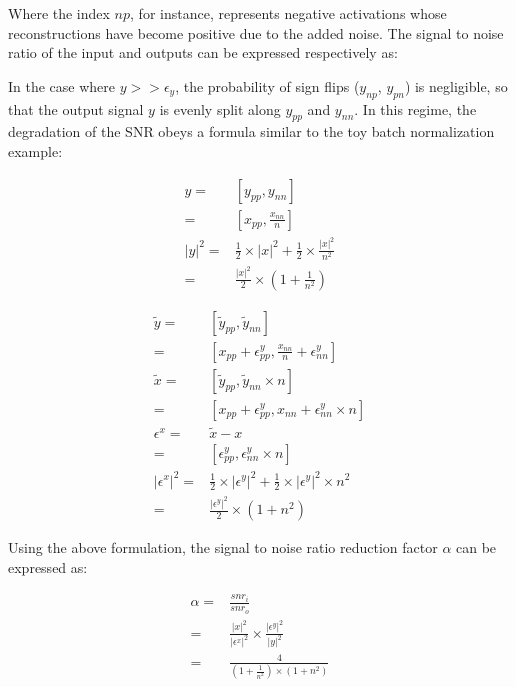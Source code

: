 \documentclass[twocolumn]{bmcart}
\begin{document}
\begin{backmatter}
Where the index $np$, for instance, represents negative activations whose reconstructions have become positive due to the added noise.
The signal to noise ratio of the input and outputs can be expressed respectively as:

In the case where $y >> \epsilon_y$, the probability of sign flips ($y_{np}$, $y_{pn}$) is negligible,
so that the output signal $y$ is evenly split along $y_{pp}$ and $y_{nn}$.
In this regime, the degradation of the SNR obeys a formula similar to the toy batch normalization example:

\begin{subequations}
\begin{align}
 y =& [y_{pp}, y_{nn}] \\
   =& [x_{pp}, \frac{x_{nn}}{n}] \\
 |y|^2 =& \frac{1}{2} \times |x|^2 + \frac{1}{2} \times \frac{|x|^2}{n^2} \\
       =&\frac{|x|^2}{2} \times (1+\frac{1}{n^2})
\end{align}
\end{subequations}

\begin{subequations}
\begin{align}
\tilde{y}       =& [ \tilde{y}_{pp}, \tilde{y}_{nn}] \\
                =& [ x_{pp} + \epsilon_{pp}^y, \frac{x_{nn}}{n} + \epsilon_{nn}^y ] \\
\tilde{x}       =& [ \tilde{y}_{pp}, \tilde{y}_{nn} \times n] \\
                =& [ x_{pp} + \epsilon_{pp}^y, x_{nn} + \epsilon_{nn}^y \times n  ]\\
\epsilon^x      =& \tilde{x} - x\\
                =& [ \epsilon_{pp}^y, \epsilon_{nn}^y \times n ]\\
|\epsilon^x|^2  =& \frac{1}{2} \times |\epsilon^y|^2 + \frac{1}{2} \times |\epsilon^y|^2 \times n^2 \\
                =& \frac{|\epsilon^y|^2}{2} \times (1 + n^2)
\end{align}
\end{subequations}

Using the above formulation, the signal to noise ratio reduction factor $\alpha$ can be expressed as:

\begin{subequations}
\begin{align}
\alpha =& \frac{snr_i}{snr_o} \\
       =& \frac{|x|^2}{|\epsilon^x|^2} \times  \frac{|\epsilon^y|^2}{|y|^2} \\
       =& \frac{4}{(1+\frac{1}{n^2}) \times (1 + n^2)}
\end{align}
\end{subequations}


\end{backmatter}
\end{document}
